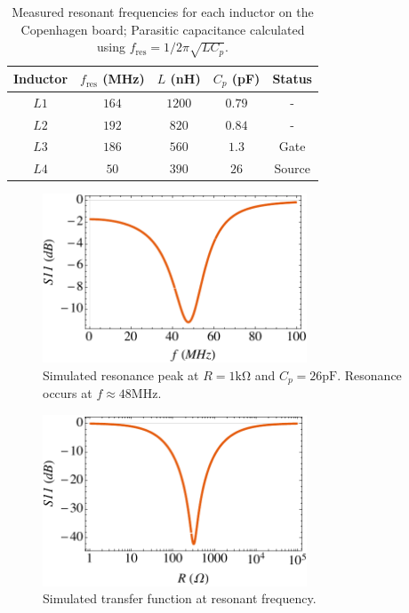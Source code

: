 \documentclass{article}
\begin{document}
\begin{table}[H]
    \centering
    \begin{tabular}{| c | c  | c | c | c |}
        \hline
        Inductor & $f_\mathrm{res}$ (\si{\mega\hertz}) & $L$ (\si{\nano\henry}) & $C_p$ (\si{\pico\farad}) & Status \\[0.5ex]
        \hline \hline
        $L1$     & $164$                               & $1200$                 & $0.79$                   & -      \\
        $L2$     & $192$                               & $820$                  & $0.84$                   & -      \\
        $L3$     & $186$                               & $560$                  & $1.3$                    & Gate   \\
        $L4$     & $50$                                & $390$                  & $26$                     & Source \\ \hline
    \end{tabular}
    \caption{Measured resonant frequencies for each inductor on the Copenhagen board; Parasitic capacitance calculated using $f_\mathrm{res} = 1/2\pi\sqrt{LC_p}$.}
    \label{table:capacitances}
\end{table}

\begin{figure}[H]
    \centering
    \includegraphics[width=0.7\textwidth]{S11_resonance.pdf}
    \caption{Simulated resonance peak at $R=1\si{\kilo\ohm}$ and $C_p = 26\si{\pico\farad}$. Resonance occurs at $f \approx 48\si{\mega\hertz}$.}
    \label{fig:resonancesim}
\end{figure}
\begin{figure}[H]
    \centering
    \includegraphics[width = 0.7\textwidth]{S11_cs0db.pdf}
    \caption{Simulated transfer function at resonant frequency.}
    \label{fig:s11cs0db}
\end{figure}
\end{document}
